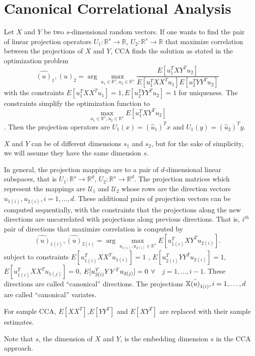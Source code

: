 \documentclass[12pt,oneside,final]{thesis}
\begin{document}
\section{Canonical Correlational Analysis}

 Let $X$ and $Y$ be two $s$-dimensional random vectors. If  one wants to find  the pair of linear projection operators $U_1:\mathbb{R}^s \rightarrow  \mathbb{R}$, $U_2 :\mathbb{R}^s \rightarrow  \mathbb{R}$ that maximize correlation between the projections of   $X$ and $Y$, CCA finds the solution as stated in the  optimization problem
$$
{\hat{(u)}_1 ,\hat{(u)}_2}=\arg\max_{u_1\in\mathbb{R}^s,u_2\in\mathbb{R}^s} {\frac{E[u_1^{T}XY^Tu_2]}{{E[u_1^{T}XX^T u_1]}{E[u_2^{T}YY^T u_2]}}}$$
with the constraints $E[{u_1^{T}XX^T u_1}]=1 , E[{u_2^{T}YY^T u_2}]=1$ for uniqueness. The constraints simplify the optimization function to $$
\max_{u_1\in \mathbb{R}^s,u_2\in \mathbb{R}^s} {E[u_1^{T}XY^Tu_2]}$$. Then the projection operators are $U_1(x)=(\hat{u}_1)^{T} x$ and $U_1(y)=(\hat{u}_2)^{T} y$.
\begin{remark}
$X$ and $Y$ can be of different dimensions $s_1$ and $s_2$, but for  the sake of simplicity, we will assume they have the same dimension $s$. 
\end{remark}
In general, the projection mappings are to a pair of $d$-dimensional linear subspaces, that is $U_1:\mathbb{R}^s \rightarrow  \mathbb{R}^{d}$, $U_2 :\mathbb{R}^s \rightarrow  \mathbb{R}^{d}$. The projection matrices which represent the mappings are $\mathcal{U}_1$ and $\mathcal{U}_2$  whose rows are the direction vectors ${{u}_{1(i)},{u}_{2(i)}}, i=1,\ldots,d $. These additional pairs of projection vectors can be computed sequentially, with the constraints that the projections along the new directions are uncorrelated with  projections along previous directions. That is, $i^{th}$ pair of directions  that maximize correlation is computed by 
$$
{\hat{(u)}_{1(i)},\hat{(u)}_{2(i)}}=\arg\max_{u_{1(i)},u_{2(i)}\in\mathbb{R}^s} {E[u_{1(i)}^{T}XY^Tu_{2(i)}]}.$$ subject to constraints $E[{u_{1(i)}^{T}XX^T u_{1(i)}}]=1$ , $E[{u_{2(i)}^{T}YY^T u_{2(i)}}]=1$, $E[{u_{1(i)}^{T}XX^T u_{1(j)}}]=0$,  
   $ E[{u_{2(i)}^{T}YY^T u_{2(j)}}]=\nolinebreak0$ $\forall \quad  j=1,\ldots,i-1$.  These directions are called ``canonical'' directions. The projections $\mathbb{X} \hat{(u)}_{1(i)}, i=1,\ldots,d$ are called ``canonical'' variates.
   
   For sample CCA, $E[XX^T]$,$E[YY^T]$ and $E[XY^T]$ are replaced with their sample estimates.


Note that $s$, the dimension of $X$ and $Y$, is the embedding dimension $s$  in the CCA approach. 
\end{document}
